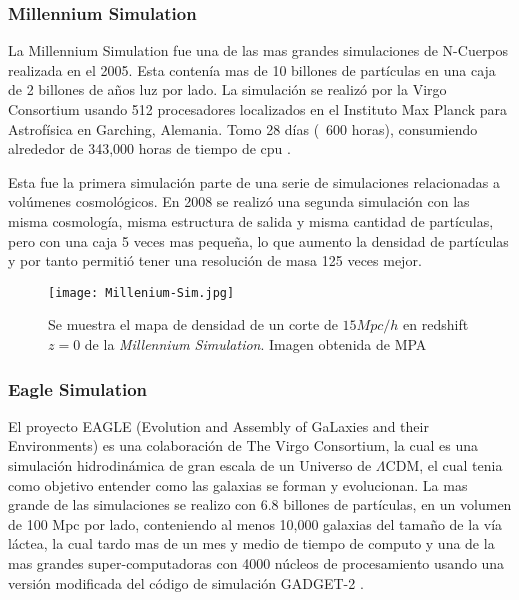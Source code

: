 \subsubsection{Millennium Simulation}

La Millennium Simulation fue una de las mas grandes simulaciones de N-Cuerpos realizada en el 2005. Esta contenía mas de 10 billones de partículas en una caja de 2 billones de años luz por lado. La simulación se realizó por la Virgo Consortium usando 512 procesadores localizados en el Instituto Max Planck para Astrofísica en Garching, Alemania. Tomo 28 días (~600 horas), consumiendo alrededor de 343,000 horas de tiempo de cpu \cite{2005Natur.435..629S}.

Esta fue la primera simulación parte de una serie de simulaciones relacionadas a volúmenes cosmológicos. En 2008 se realizó una segunda simulación con las misma cosmología, misma estructura de salida y misma cantidad de partículas, pero con una caja 5 veces mas pequeña, lo que aumento la densidad de partículas y por tanto permitió tener una resolución de masa 125 veces mejor.

\begin{figure}[H]
    \centering
    \texttt{[image: Millenium-Sim.jpg]}
    \caption[Millennium Simulation Cosmic Web]{Se muestra el mapa de densidad de un corte de $15 Mpc/h$ en redshift $z=0$ de la \textit{Millennium Simulation}. Imagen obtenida de MPA}
    \label{fig:Millennium_Sim}
\end{figure}


\subsubsection{Eagle Simulation}
El proyecto EAGLE (Evolution and Assembly of GaLaxies and their Environments)  es una colaboración de The Virgo Consortium, la cual es una simulación hidrodinámica de gran escala de un Universo de $\Lambda$CDM, el cual tenia como objetivo entender como las galaxias se forman y evolucionan. La mas grande de las simulaciones se realizo con  6.8 billones de partículas, en un volumen de 100 Mpc por lado, conteniendo al menos 10,000 galaxias del tamaño de la vía láctea, la cual tardo mas de un mes y medio de tiempo de computo y una de la mas grandes super-computadoras con 4000 núcleos de procesamiento usando una versión modificada del código de simulación GADGET-2 \cite{2015MNRAS.450.1937C, 2015MNRAS.446..521S}.

